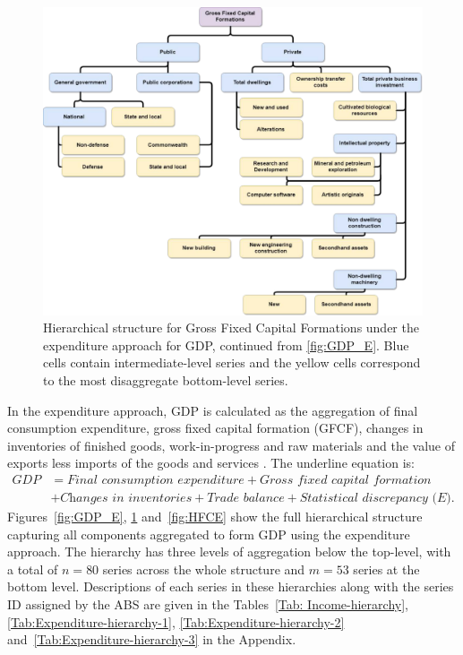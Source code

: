 \documentclass[a4paper, 11pt]{article}
\begin{document}
\begin{figure}[!t]
	\centering
	\includegraphics[width=.9\textwidth]{Figs/Hierarchical-structures/GFCF.pdf}
	\caption{Hierarchical structure for Gross Fixed Capital Formations under the expenditure approach for GDP, continued from \autoref{fig:GDP_E}. Blue cells contain intermediate-level series and the yellow cells correspond to the most disaggregate bottom-level series.}\label{fig:GFCF}
\end{figure}

In the expenditure approach, GDP is calculated as the aggregation of final consumption expenditure, gross fixed capital formation (GFCF), changes in inventories of finished goods, work-in-progress and raw materials and the value of exports less imports of the goods and services \citep{ABS2015}. The underline equation is:
\begin{align*}
\textit{GDP}
& = \textit{Final consumption expenditure}
+ \textit{Gross fixed capital formation} \\
& + \textit{Changes in inventories}
+ \textit{Trade balance}
+ \textit{Statistical discrepancy (E)}.
\end{align*}
Figures~\ref{fig:GDP_E}, \ref{fig:GFCF} and~\ref{fig:HFCE} show the full hierarchical structure capturing all components aggregated to form GDP using the expenditure approach. The hierarchy has three levels of aggregation below the top-level, with a total of $n=80$ series across the whole structure and $m=53$ series at the bottom level. Descriptions of each series in these hierarchies along with the series ID assigned by the ABS are given in the Tables~\ref{Tab: Income-hierarchy}, \ref{Tab:Expenditure-hierarchy-1}, \ref{Tab:Expenditure-hierarchy-2} and~\ref{Tab:Expenditure-hierarchy-3} in the Appendix.
\end{document}
